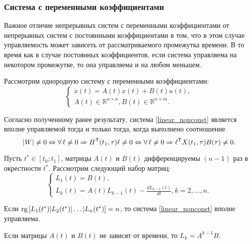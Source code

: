 \subsubsection{Система с переменными коэффициентами}

Важное отличие непрерывных систем с переменными коэффициентами от непрерывных систем
с постоянными коэффициентами в том, что в этом случае управляемость может зависеть от
рассматриваемого промежутка времени. В то время как в случае постоянных коэффициентов,
если система управляема на некотором промежутке, то она управляема и на любом меньшем.

Рассмотрим однородную систему с переменными коэффициентами:
\begin{equation}
\label{linear_nonconst}
  \begin{cases}
    \dot{x}(t) = A(t) x(t) + B(t) u(t),\\
    A(t) \in \mathbb{R}^{n \times n}, B(t) \in \mathbb{R}^{n \times m}.
  \end{cases}
\end{equation}

Согласно полученному ранее результату, система \eqref{linear_nonconst}
является вполне управляемой тогда и только тогда, когда выполнено соотношение
\begin{equation*}
  \abs{W} \neq 0 \Leftrightarrow
  \forall \ell \neq 0 \Rightarrow H^\tran(t_1, \tau) \ell \neq 0 \Leftrightarrow
  \forall \ell \neq 0 \Rightarrow \ell^\tran X(t_1, \tau) B(\tau) \neq 0.
\end{equation*}

\begin{theorem}
  Пусть $t^* \in [t_0; t_1]$, матрицы $A(t)$ и $B(t)$ дифференцируемы $(n - 1)$ раз
  в окрестности $t^*$. Рассмотрим следующий набор матриц:
  \begin{equation*}
    \begin{cases}
      L_1(t) = B(t),\\
      L_{k}(t) = A(t) L_{k - 1}(t) - \frac{d L_{k - 1}(t)}{d t}, k = 2, \ldots, n.
    \end{cases}
  \end{equation*}
  
  Если $\operatorname{rg}\left[L_{1}(t^*) | L_{2}(t^*) | \ldots | L_{n}(t^*) \right] = n$,
  то система \eqref{linear_nonconst} вполне управляема.
\end{theorem}

\begin{note}
  Если матрицы $A(t)$ и $B(t)$ не зависят от времени, то $L_{k} = A^{k - 1} B$.
\end{note}

